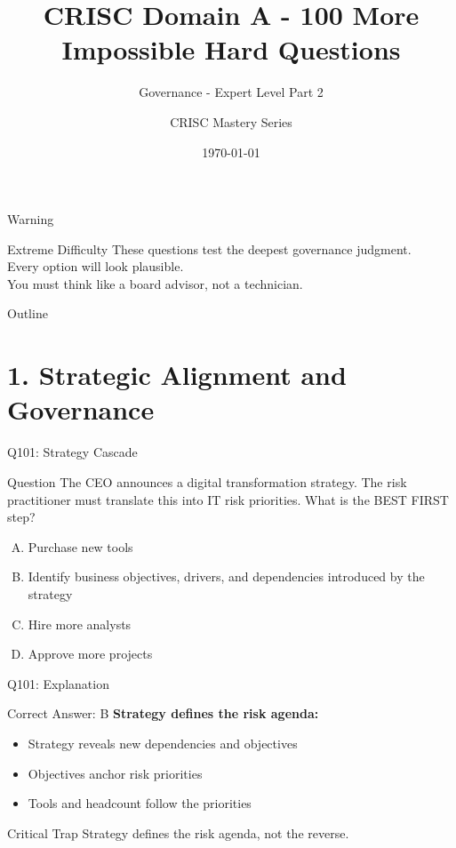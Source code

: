 \documentclass{beamer}
\title{CRISC Domain A - 100 More Impossible Hard Questions}
\subtitle{Governance - Expert Level Part 2}
\author{CRISC Mastery Series}
\date{\today}
\begin{document}
	
	\begin{frame}
		\titlepage
	\end{frame}
	
	\begin{frame}{Warning}
		\begin{alertblock}{Extreme Difficulty}
			These questions test the deepest governance judgment.\\
			Every option will look plausible.\\
			You must think like a board advisor, not a technician.
		\end{alertblock}
	\end{frame}
	
	\begin{frame}{Outline}
		\tableofcontents
	\end{frame}
	
	\section{1. Strategic Alignment and Governance}
	
	\begin{frame}{Q101: Strategy Cascade}
		\begin{block}{Question}
			The CEO announces a digital transformation strategy. The risk practitioner must translate this into IT risk priorities. What is the BEST FIRST step?
		\end{block}
		\begin{enumerate}[(A)]
			\item Purchase new tools
			\item Identify business objectives, drivers, and dependencies introduced by the strategy
			\item Hire more analysts
			\item Approve more projects
		\end{enumerate}
	\end{frame}
	
	\begin{frame}{Q101: Explanation}
		\begin{block}{Correct Answer: B}
			\textbf{Strategy defines the risk agenda:}
			\begin{itemize}
				\item Strategy reveals new dependencies and objectives
				\item Objectives anchor risk priorities
				\item Tools and headcount follow the priorities
			\end{itemize}
		\end{block}
		\begin{alertblock}{Critical Trap}
			Strategy defines the risk agenda, not the reverse.
		\end{alertblock}
	\end{frame}
	
\end{document}
